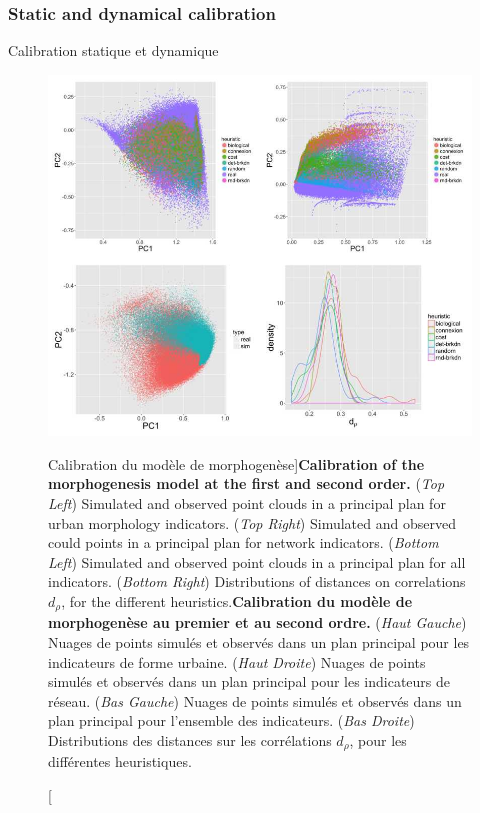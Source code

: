 \subsubsection{Static and dynamical calibration}{Calibration statique et dynamique}




\begin{figure}
	\includegraphics[width=\linewidth]{Figures/Final/7-2-2-fig-mesocoevolmodel-calibration.jpg}
	\caption[Calibration of the morphogenesis model][Calibration du modèle de morphogenèse]{\textbf{Calibration of the morphogenesis model at the first and second order.} (\textit{Top Left}) Simulated and observed point clouds in a principal plan for urban morphology indicators. (\textit{Top Right}) Simulated and observed could points in a principal plan for network indicators. (\textit{Bottom Left}) Simulated and observed point clouds in a principal plan for all indicators. (\textit{Bottom Right}) Distributions of distances on correlations $d_{\rho}$, for the different heuristics.\label{fig:mesocoevolmodel:calibration}}{\textbf{Calibration du modèle de morphogenèse au premier et au second ordre.} (\textit{Haut Gauche}) Nuages de points simulés et observés dans un plan principal pour les indicateurs de forme urbaine. (\textit{Haut Droite}) Nuages de points simulés et observés dans un plan principal pour les indicateurs de réseau. (\textit{Bas Gauche}) Nuages de points simulés et observés dans un plan principal pour l'ensemble des indicateurs. (\textit{Bas Droite}) Distributions des distances sur les corrélations $d_{\rho}$, pour les différentes heuristiques.\label{fig:mesocoevolmodel:calibration}}
\end{figure}


